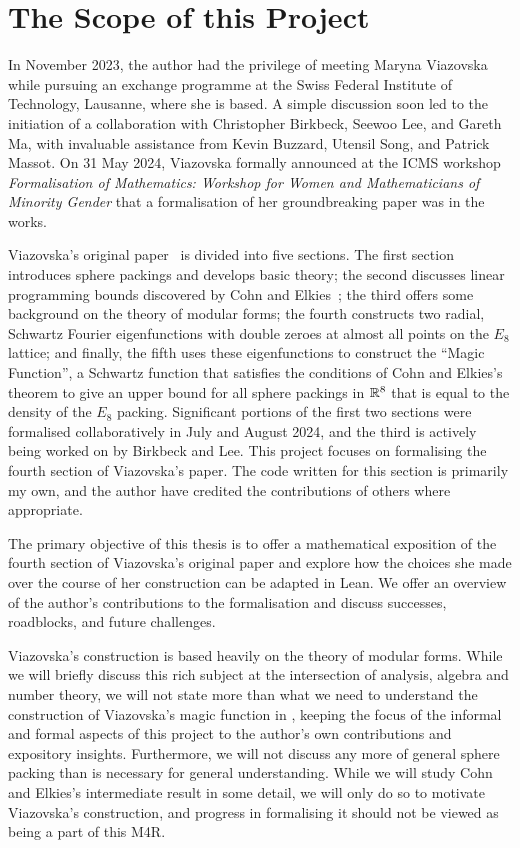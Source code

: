 \section{The Scope of this Project}


In November 2023, the author had the privilege of meeting Maryna Viazovska while pursuing an exchange programme at the Swiss Federal Institute of Technology, Lausanne, where she is based. A simple discussion soon led to the initiation of a collaboration with Christopher Birkbeck, Seewoo Lee, and Gareth Ma, with invaluable assistance from Kevin Buzzard, Utensil Song, and Patrick Massot. On 31 May 2024, Viazovska formally announced at the ICMS workshop \textit{Formalisation of Mathematics: Workshop for Women and Mathematicians of Minority Gender} that a formalisation of her groundbreaking paper was in the works.

Viazovska's original paper~\cite{Viazovska8} is divided into five sections. The first section introduces sphere packings and develops basic theory; the second discusses linear programming bounds discovered by Cohn and Elkies~\cite[Theorem 3.1]{CohnElkies}; the third offers some background on the theory of modular forms; the fourth constructs two radial, Schwartz Fourier eigenfunctions with double zeroes at almost all points on the $E_8$ lattice; and finally, the fifth uses these eigenfunctions to construct the ``Magic Function'', a Schwartz function that satisfies the conditions of Cohn and Elkies's theorem to give an upper bound for all sphere packings in $\mathbb{R}^8$ that is equal to the density of the $E_8$ packing. Significant portions of the first two sections were formalised collaboratively in July and August 2024, and the third is actively being worked on by Birkbeck and Lee. This project focuses on formalising the fourth section of Viazovska's paper. The code written for this section is primarily my own, and the author have credited the contributions of others where appropriate.

The primary objective of this thesis is to offer a mathematical exposition of the fourth section of Viazovska's original paper and explore how the choices she made over the course of her construction can be adapted in Lean. We offer an overview of the author's contributions to the formalisation and discuss successes, roadblocks, and future challenges.

Viazovska's construction is based heavily on the theory of modular forms. While we will briefly discuss this rich subject at the intersection of analysis, algebra and number theory, we will not state more than what we need to understand the construction of Viazovska's magic function in \cite[\S 4]{Viazovska8}, keeping the focus of the informal and formal aspects of this project to the author's own contributions and expository insights. Furthermore, we will not discuss any more of general sphere packing than is necessary for general understanding. While we will study Cohn and Elkies's intermediate result in some detail, we will only do so to motivate Viazovska's construction, and progress in formalising it should not be viewed as being a part of this M4R.

